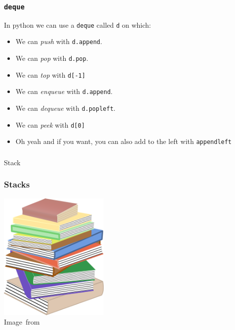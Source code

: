 \begin{frame}
	\frametitle{\texttt{deque}}
	
	In python we can use a \texttt{deque} called \texttt{d} on which:
	\begin{itemize}
		\item We can \textit{push} with \texttt{d.append}.
		\item We can \textit{pop} with \texttt{d.pop}.
		\item We can \textit{top} with \texttt{d[-1]}
			\pause
		\item We can \textit{enqueue} with \texttt{d.append}.
		\item We can \textit{dequeue} with \texttt{d.popleft}.
		\item We can \textit{peek} with \texttt{d[0]}
			\pause
		\item Oh yeah and if you want, you can also add to the left with \texttt{appendleft}
	\end{itemize}
\end{frame}


\begin{frame}[fragile]\frametitle{}
\begin{center}
{\Large Stack}
\end{center}

\end{frame}


\begin{frame}
	\frametitle{Stacks}
	\begin{center}
		\includegraphics[width=0.4\textwidth]{images/stack_of_books.png}\\
		\hspace*{15pt}\hbox{\scriptsize Image from }
	\end{center}
\end{frame}

